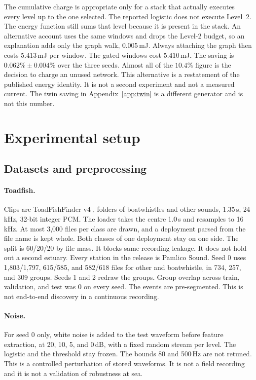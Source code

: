\documentclass[sn-mathphys-num]{sn-jnl}%
\theoremstyle{thmstyleone}%
\theoremstyle{thmstyletwo}%
\theoremstyle{thmstylethree}%
\begin{document}
The cumulative charge is appropriate only for a stack that actually executes every level up to the one selected. The reported logistic does not execute Level~2. The energy function still sums that level because it is present in the stack. An alternative account uses the same windows and drops the Level-2 budget, so an explanation adds only the graph walk, $0.005$\,mJ. Always attaching the graph then costs $5.413$\,mJ per window. The gated windows cost $5.410$\,mJ. The saving is $0.062\% \pm 0.004\%$ over the three seeds. Almost all of the $10.4\%$ figure is the decision to charge an unused network. This alternative is a restatement of the published energy identity. It is not a second experiment and not a measured current. The twin saving in Appendix~\ref{app:twin} is a different generator and is not this number.

\section{Experimental setup}\label{sec:setup}

\subsection{Datasets and preprocessing}\label{sec:data}

\paragraph{Toadfish.}
Clips are ToadFishFinder v4 \cite{bohnenstiehl2023data}, folders of boatwhistles and other sounds, 1.35\,s, 24\,kHz, 32-bit integer PCM. The loader takes the centre 1.0\,s and resamples to 16\,kHz. At most 3{,}000 files per class are drawn, and a deployment parsed from the file name is kept whole. Both classes of one deployment stay on one side. The split is 60/20/20 by file mass. It blocks same-recording leakage. It does not hold out a second estuary. Every station in the release is Pamlico Sound. Seed 0 uses 1{,}803/1{,}797, 615/585, and 582/618 files for other and boatwhistle, in 734, 257, and 309 groups. Seeds 1 and 2 redraw the groups. Group overlap across train, validation, and test was 0 on every seed. The events are pre-segmented. This is not end-to-end discovery in a continuous recording.

\paragraph{Noise.}
For seed 0 only, white noise is added to the test waveform before feature extraction, at 20, 10, 5, and 0\,dB, with a fixed random stream per level. The logistic and the threshold stay frozen. The bounds 80 and 500\,Hz are not retuned. This is a controlled perturbation of stored waveforms. It is not a field recording and it is not a validation of robustness at sea.
\end{document}
